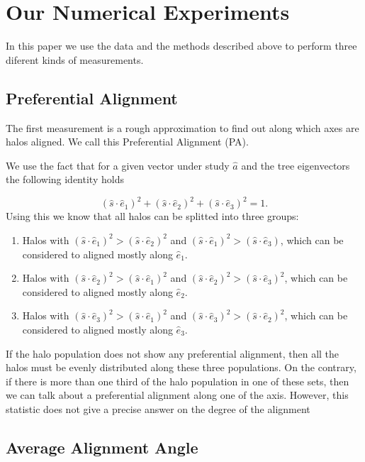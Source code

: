 \documentclass[useAMS,usenatbib]{mn2e}
\begin{document}
\section{Our Numerical Experiments}
In this paper we use the data and the methods described above to
perform three diferent kinds of measurements.


\subsection{Preferential Alignment}

The first measurement is a rough approximation to find out along which
axes are halos aligned. We call this Preferential Alignment (PA). 

We use the fact that for a given vector under study $\hat{a}$ and the
tree eigenvectors the following identity holds  
 
\begin{equation}
(\hat{s}\cdot\hat{e}_1)^2 +(\hat{s}\cdot\hat{e}_2)^2 +(\hat{s}\cdot\hat{e}_3)^2 =1.
\end{equation}
%
Using this we know that all halos can be splitted into three groups:

\begin{enumerate}
\item Halos with $(\hat{s}\cdot\hat{e}_1)^2> (\hat{s}\cdot\hat{e}_2)^2$
  and $(\hat{s}\cdot\hat{e}_1)^2> (\hat{s}\cdot\hat{e}_3)$, which can
  be considered to aligned mostly along $\hat{e}_1$.
\item Halos with $(\hat{s}\cdot\hat{e}_2)^2> (\hat{s}\cdot\hat{e}_1)^2$
  and $(\hat{s}\cdot\hat{e}_2)^2> (\hat{s}\cdot\hat{e}_3)^2$, which can
  be considered to aligned mostly along $\hat{e}_2$.
\item Halos with $(\hat{s}\cdot\hat{e}_3)^2> (\hat{s}\cdot\hat{e}_1)^2$
  and $(\hat{s}\cdot\hat{e}_3)^2> (\hat{s}\cdot\hat{e}_2)^2$, which can
  be considered to aligned mostly along $\hat{e}_3$.
\end{enumerate}

If the halo population does not show any preferential alignment, then
all the halos must be evenly distributed along these three
populations. On the contrary, if there is more than one third of the
halo population in one of these sets, then we can talk about a
preferential alignment along one of the axis. However, this statistic 
does not give a precise answer on the degree of the alignment


\subsection{Average Alignment Angle}
\end{document}
